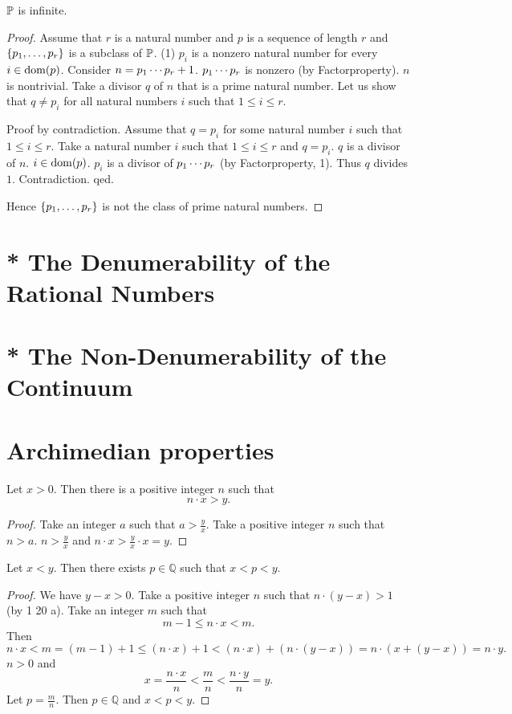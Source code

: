 \documentclass{article}
\begin{document}
\begin{theorem}[Euclid]
$\mathbb{P}$ is infinite.
\end{theorem}
\begin{proof}
Assume that $r$ is a natural number and
$p$ is a sequence of length $r$ and
$\{p_{1},\dots,p_{r}\}$ is a subclass of $\mathbb{P}$.
(1) $p_{i}$ is a nonzero natural number for every
$i \in  \operatorname{dom}(p)$.
Consider $n=p_{1} \cdots p_{r}+1$.
$p_{1} \cdots p_{r}$ is nonzero (by Factorproperty).
$n$ is nontrivial.
Take a divisor $q$ of $n$ that is a prime natural number.
Let us show that $q \neq p_{i}$ 
for all natural numbers $i$ such that $1 \leq i \leq r$.

Proof by contradiction.
Assume that $q=p_{i}$ for some natural number $i$ such that
$1 \leq i \leq r$.
Take a natural number $i$ such that $1 \leq i \leq r$
and $q=p_{i}$.
$q$ is a divisor of $n$.
$i \in \operatorname{dom}(p)$. $p_{i}$ is a divisor of $p_{1} \cdots p_{r}$
(by Factorproperty, 1).
Thus $q$ divides $1$.
Contradiction. qed.

Hence $\{p_{1},\dots,p_{r}\}$ is not the class of prime natural numbers.
\end{proof}


\section{* The Denumerability of the Rational Numbers}

\section{* The Non-Denumerability of the Continuum}

\section{Archimedian properties}

\begin{forthel}

\begin{theorem}[1 20 a]
Let $x > 0$.
Then there is a
positive integer $n$ such that \[ n \cdot x > y. \]
\end{theorem}
\begin{proof}
Take an integer $a$ such that $a > \frac{y}{x}$.
Take a positive integer $n$ such that $n > a$.
$n > \frac{y}{x}$ and $n \cdot x > \frac{y}{x} \cdot x = y$.
\end{proof}

\begin{theorem}[1 20 b]
Let $x < y$. Then there exists
$p \in \mathbb{Q}$ such that $x < p < y$.
\end{theorem}
\begin{proof}
We have $y - x > 0$.
Take a positive integer $n$ such that
$n\cdot (y-x) > 1$ (by 1 20 a).
Take an integer $m$ such that
\[ m -1 \leq n \cdot x < m. \]
Then
\[ n \cdot x < m = (m - 1) + 1 \leq (n\cdot x) + 1 <
(n\cdot x) + (n\cdot (y-x)) = n \cdot (x + (y - x)) = n \cdot y. \]
$n > 0$ and
\[ x = \frac{n\cdot x}{n} < \frac{m}{n} < \frac{n\cdot y}{n} = y. \]
Let $p = \frac{m}{n}$. Then $p \in \mathbb{Q}$ and $x < p < y$.
\end{proof}

\end{forthel}
\end{document}
